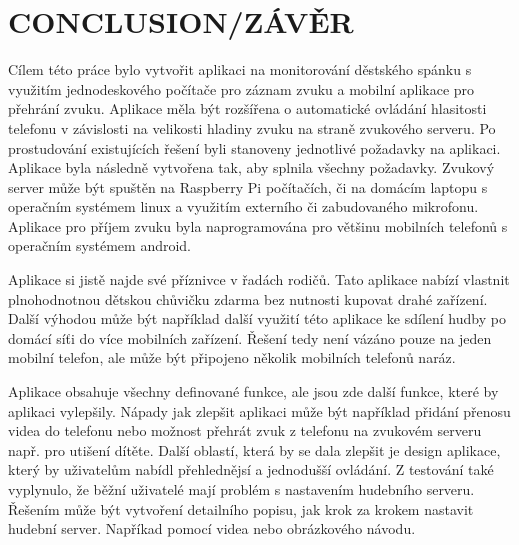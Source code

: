 \documentclass[journal, a4paper]{IEEEtran}
\begin{document}
\section{CONCLUSION/ZÁVĚR}
Cílem této práce bylo vytvořit aplikaci na monitorování děstského spánku s využitím jednodeskového počítače pro záznam zvuku a mobilní aplikace pro přehrání zvuku. Aplikace měla být rozšířena o automatické ovládání hlasitosti telefonu v závislosti na velikosti hladiny zvuku na straně zvukového serveru. Po prostudování existujících řešení byli stanoveny jednotlivé požadavky na aplikaci. Aplikace byla následně vytvořena tak, aby splnila všechny požadavky. Zvukový server může být spuštěn na Raspberry Pi počítačích, či na domácím laptopu s operačním systémem linux a využitím externího či zabudovaného mikrofonu. Aplikace pro příjem zvuku byla naprogramována pro většinu mobilních telefonů s operačním systémem android. \par
Aplikace si jistě najde své příznivce v řadách rodičů. Tato aplikace nabízí vlastnit plnohodnotnou dětskou chůvičku zdarma bez nutnosti kupovat drahé zařízení. Další výhodou může být například další využití této aplikace ke sdílení hudby po domácí síťi do více mobilních zařízení. Řešení tedy není vázáno pouze na jeden mobilní telefon, ale může být připojeno několik mobilních telefonů naráz. \par
Aplikace obsahuje všechny definované funkce, ale jsou zde další funkce, které by aplikaci vylepšily. Nápady jak zlepšit aplikaci může být například přidání přenosu videa do telefonu nebo možnost přehrát zvuk z telefonu na zvukovém serveru např. pro utišení dítěte. Další oblastí, která by se dala zlepšit je design aplikace, který by uživatelům nabídl přehlednějsí a jednodušší ovládání. Z testování také vyplynulo, že běžní uživatelé mají problém s nastavením hudebního serveru. Řešením může být vytvoření detailního popisu, jak krok za krokem nastavit hudební server. Napříkad pomocí videa nebo obrázkového návodu.
\end{document}
